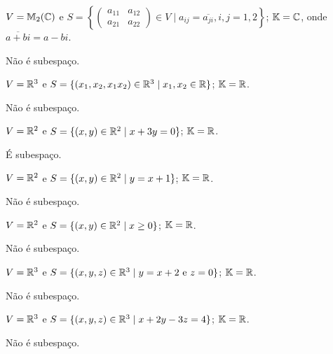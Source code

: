 \documentclass[12pt]{exam}
\begin{document}
\begin{exercicio}
	$V = \mathbb{M}_2(\mathbb{C})$ e $S = \left\{\begin{pmatrix} a_{11} & a_{12}\\ a_{21} & a_{22}\end{pmatrix} \in V \mid a_{ij} = \overline{a_{ji}}, i, j = 1, 2\right\}$; $\mathbb{K} = \mathbb{C}$, onde $\overline{a + bi} = a - bi$.
	\begin{solucao}
		N\~ao \'e subespa\c{c}o.
	\end{solucao}
\end{exercicio}

\begin{exercicio}
	$V = \mathbb{R}^3$ e $S = \{(x_1, x_2, x_1x_2) \in \mathbb{R}^3 \mid x_1, x_2 \in \mathbb{R}\}$; $\mathbb{K} = \mathbb{R}$.
	\begin{solucao}
		N\~ao \'e subespa\c{c}o.
	\end{solucao}
\end{exercicio}

\begin{exercicio}
	$V = \mathbb{R}^2$ e $S = \{(x, y) \in \mathbb{R}^2 \mid x + 3y = 0\}$; $\mathbb{K} = \mathbb{R}$.
	\begin{solucao}
		\'E subespa\c{c}o.
	\end{solucao}
\end{exercicio}

\begin{exercicio}
	$V = \mathbb{R}^2$ e $S = \{(x, y) \in \mathbb{R}^2 \mid y = x + 1\}$; $\mathbb{K} = \mathbb{R}$.
	\begin{solucao}
		N\~ao \'e subespa\c{c}o.
	\end{solucao}
\end{exercicio}

\begin{exercicio}
	$V = \mathbb{R}^2$ e $S = \{(x, y) \in \mathbb{R}^2 \mid x \ge 0\}$; $\mathbb{K} = \mathbb{R}$.
	\begin{solucao}
		N\~ao \'e subespa\c{c}o.
	\end{solucao}
\end{exercicio}

\begin{exercicio}
	$V = \mathbb{R}^3$ e $S = \{(x, y, z) \in \mathbb{R}^3 \mid y = x + 2 \mbox{ e } z = 0\}$; $\mathbb{K} = \mathbb{R}$.
	\begin{solucao}
		N\~ao \'e subespa\c{c}o.
	\end{solucao}
\end{exercicio}

\begin{exercicio}
	$V = \mathbb{R}^3$ e $S = \{(x, y, z) \in \mathbb{R}^3 \mid x + 2y -3z = 4\}$; $\mathbb{K} = \mathbb{R}$.
	\begin{solucao}
		N\~ao \'e subespa\c{c}o.
	\end{solucao}
\end{exercicio}
\end{document}
